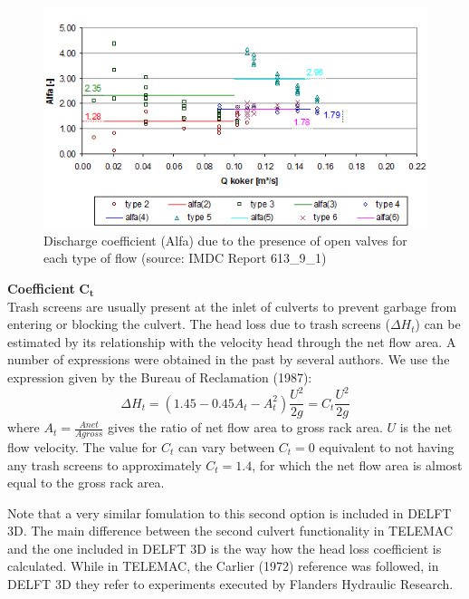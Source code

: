 \begin{figure}[H]
\begin{center}
  \includegraphics[scale=1]{culvert_fig8.png}
\end{center}
\caption{Discharge coefficient (Alfa) due to the presence of open valves for
each type of flow (source: IMDC Report 613\_9\_1)}
\label{fig:culvert_fig8}
\end{figure}

\textbf{Coefficient} $\mathbf{C_t}$\\

Trash screens are usually present at the inlet of culverts to prevent garbage
from entering or blocking the culvert. The head loss due to trash screens
($\Delta H_t$) can be estimated by its relationship with the velocity
head through the net flow area.
A number of expressions were obtained in the past by several authors.
We use the expression given by the Bureau of Reclamation (1987):
\begin{equation}
\Delta H_t = (1.45-0.45A_t-A_t^2)\dfrac{U^2}{2g} = C_t \dfrac{U^2}{2g}
\end{equation}
where $A_t=\frac{Anet}{Agross}$ gives the ratio of net flow area to gross rack area.
$U$ is the net flow velocity. The value for $C_t$ can vary between $C_t= 0$ equivalent
to not having any trash screens to approximately $C_t= 1.4$, for which the net
flow area is almost equal to the gross rack area.

Note that a very similar fomulation to this second option is included in DELFT 3D.
The main difference between the second culvert functionality in TELEMAC and the one
included in DELFT 3D is the way how the head loss coefficient is calculated.
While in TELEMAC, the Carlier (1972) reference was followed, in DELFT 3D they refer
to experiments executed by Flanders Hydraulic Research.


